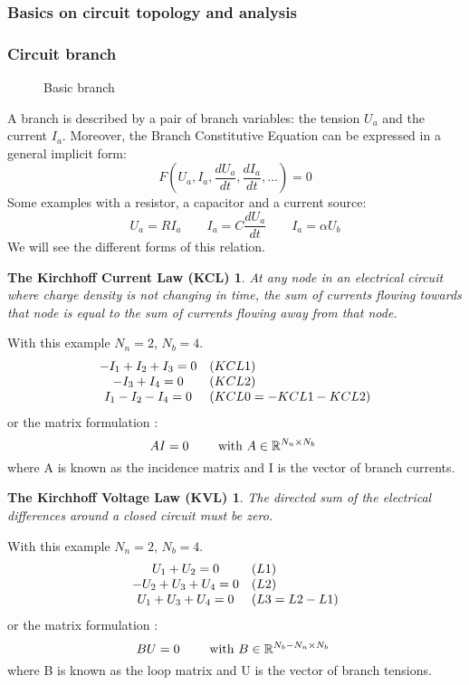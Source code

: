 \frame
{
  \frametitle{Basics on circuit topology and analysis}

}

\frame
{
  \frametitle{Circuit branch}
\begin{figure}[h]
\centerline{
 \scalebox{0.4}{
    
 }
}
\caption{Basic branch}
\end{figure}
A branch is described by a pair of branch variables: the tension $U_{a}$ and the current $I_{a}$.
Moreover, the Branch Constitutive Equation can be expressed in a general implicit form:
\begin{equation}\label{BCE}F(U_{a},I_{a},\frac{dU_{a}}{dt},\frac{dI_{a}}{dt},...)=0\end{equation}
Some examples with a resistor, a capacitor and a current source:
\[U_{a}=RI_{a} \qquad I_{a}=C\frac{dU_{a}}{dt} \qquad I_{a}=\alpha U_{b}\]
We will see the different forms of this relation.
  }

\frame
{
\newtheorem{kcl}{The Kirchhoff Current Law (KCL)}
\begin{kcl}
At any node in an electrical circuit where charge density is not changing in time, the sum of
currents flowing towards that node is equal to the sum of currents flowing away from that node.
\end{kcl}
\begin{figure}[h]
\centerline{
 \scalebox{0.35}{
    
 }
}
\end{figure}
With this example $N_n=2$, $N_b=4$.
\[
\begin{array}{c l }
-I_{1}+I_{2}+I_{3}=0 & (KCL1)\\
-I_{3}+I_{4}=0 & (KCL2) \\
I_{1}-I_{2}-I_{4}=0 & (KCL0 = -KCL1 - KCL2)\\
\end{array}
\]
or the matrix formulation :
\[AI=0 \qquad \textrm{ with ${A} \in \mathbb{R}^{N_n \times N_b}$ }\]
where A is known as the incidence matrix and I is the vector of branch currents.

}
\frame
{
\newtheorem{kvl}{The Kirchhoff Voltage Law (KVL)}
\begin{kvl}
The directed sum of the electrical differences around a closed circuit must be zero.

\end{kvl}
\begin{figure}[h]
\centerline{
 \scalebox{0.35}{
    
 }
}
\end{figure}
With this example $N_n=2$, $N_b=4$.
\[
\begin{array}{c l }
U_{1}+U_{2}=0 & (L1)\\
 -U_{2}+U_{3}+U_{4}=0&(L2)\\
 U_{1}+U_{3}+U_{4}=0&(L3 = L2 - L1)
 \end{array}
 \]
or the matrix formulation :
\[BU=0 \qquad \textrm{ with ${B} \in \mathbb{R}^{N_b - N_n \times N_b}$ }\]
where B is known as the loop matrix and U is the vector of branch tensions.
}

